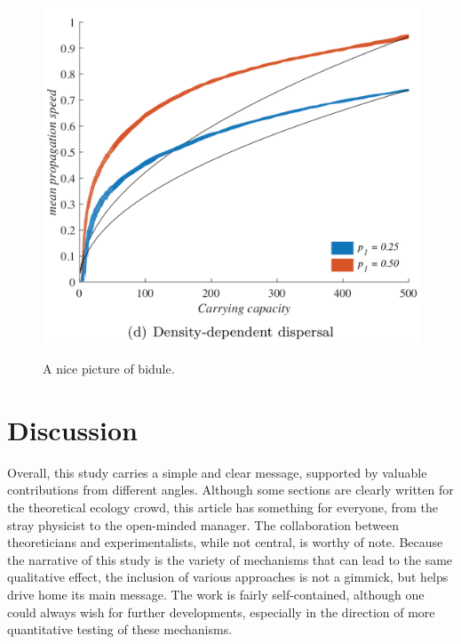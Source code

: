 \documentclass[a4paper]{article}
\begin{document}
\begin{figure}[h]
  \captionsetup{justification=centering}
  \caption{A nice picture of bidule.}
  \centering
  \includegraphics[scale=0.5]{fig.png}
  \label{Fig1}
\end{figure}

\section*{\centering Discussion}
Overall, this study carries a simple and clear message, supported by valuable contributions from different angles. Although some sections are clearly written for the theoretical ecology crowd, this article has something for everyone, from the stray physicist to the open-minded manager. The collaboration between theoreticians and experimentalists, while not central, is worthy of note. Because the narrative of this study is the variety of mechanisms that can lead to the same qualitative effect, the inclusion of various approaches is not a gimmick, but helps drive home its main message. The work is fairly self-contained, although one could always wish for further developments, especially in the direction of more quantitative testing of these mechanisms. \\ 
\end{document}
